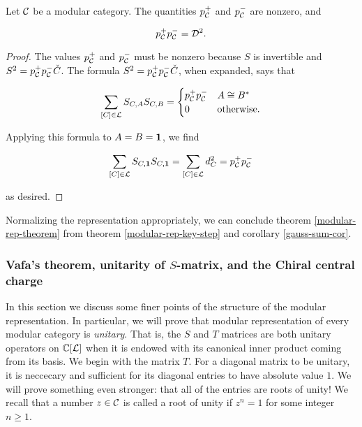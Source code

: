 \begin{cor}\label{gauss-sum-cor} Let ${\mathcal C}$ be a modular category. The quantities $p_{{\mathcal C}}^{+}$ and $p_{{\mathcal C}}^{-}$ are nonzero, and

$$p_{{\mathcal C}}^+p_{{\mathcal C}}^{-}={\mathcal D}^2.$$

\end{cor}
\begin{proof}The values $p_{{\mathcal C}}^{+}$ and $p_{{\mathcal C}}^{-}$ must be nonzero because $S$ is invertible and $S^2=p_{{\mathcal C}}^{+}p_{{\mathcal C}}^{-}{\check C}$. The formula $S^2=p_{{\mathcal C}}^{+}p_{{\mathcal C}}^{-}{\check C}$, when expanded, says that

$$
\sum_{[C]\in {\mathcal L}}S_{C,A}S_{C,B}=
\begin{cases}
p_{{\mathcal C}}^{+}p_{{\mathcal C}}^- & A\cong B^*\\
0 & \text{otherwise}.
\end{cases}
$$

Applying this formula to $A=B={\mathbf 1}$, we find

$$\sum_{[C]\in {\mathcal L}}S_{C,{\mathbf 1}}S_{C,{\mathbf 1}}=\sum_{[C]\in{\mathcal L}}d_{C}^2=p_{{\mathcal C}}^{+}p_{{\mathcal C}}^-$$

as desired.
\end{proof}

\begin{rem}
Normalizing the representation appropriately, we can conclude theorem \ref{modular-rep-theorem} from theorem \ref{modular-rep-key-step} and corollary \ref{gauss-sum-cor}.
\end{rem}

\subsubsection{Vafa's theorem, unitarity of $S$-matrix, and the Chiral central charge}
\label{vafa-theorem-unitarity-chiral-central-charge}

In this section we discuss some finer points of the structure of the modular representation. In particular, we will prove that modular representation of every modular category is {\em unitary}. That is, the $S$ and $T$ matrices are both unitary operators on ${\mathbb C}[{\mathcal L}]$ when it is endowed with its canonical inner product coming from its basis. We begin with the matrix $T$. For a diagonal matrix to be unitary, it is neccecary and sufficient for its diagonal entries to have absolute value $1$. We will prove something even stronger: that all of the entries are roots of unity! We recall that a number $z\in {\mathcal C}$ is called a root of unity if $z^n=1$ for some integer $n\geq 1$.

